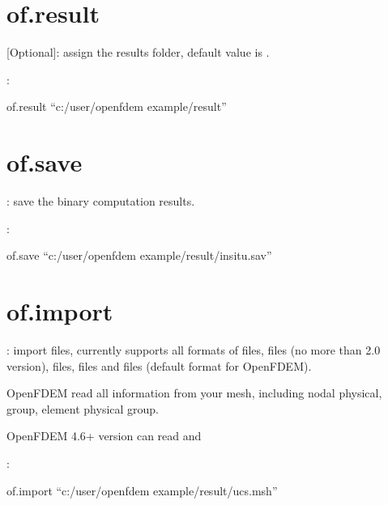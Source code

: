 \documentclass[letterpaper,10pt,english]{sphinxmanual}
\begin{document}
\section{of.result}
\label{\detokenize{rst_tutorials/command_line_guide:of-result}}
 {[}Optional{]}: assign the results folder, default value is .

:

\begin{sphinxVerbatim}[commandchars=\\\{\}]
of.result “c:/user/openfdem example/result”
\end{sphinxVerbatim}


\section{of.save}
\label{\detokenize{rst_tutorials/command_line_guide:of-save}}
: save the binary computation results.

:

\begin{sphinxVerbatim}[commandchars=\\\{\}]
of.save “c:/user/openfdem example/result/insitu.sav”
\end{sphinxVerbatim}


\section{of.import}
\label{\detokenize{rst_tutorials/command_line_guide:of-import}}
: import files, currently supports all formats of  files,  files (no more than 2.0
version),  files,  files and  files (default format for OpenFDEM).

OpenFDEM read all information from your mesh, including nodal physical, group, element physical group.

OpenFDEM 4.6+ version can read  and 

:

\begin{sphinxVerbatim}[commandchars=\\\{\}]
of.import “c:/user/openfdem example/result/ucs.msh”
\end{sphinxVerbatim}
\end{document}
